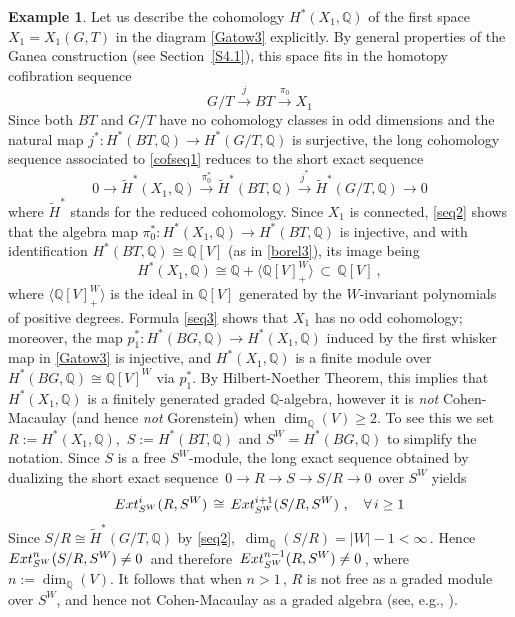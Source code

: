 \documentclass[11pt]{amsart}
\theoremstyle{definition}
\newtheorem{example}[theorem]{Example}
\theoremstyle{remark}
\numberwithin{equation}{section}
\newcommand{\la}{\label}
\def\Q{\mathbb{Q}}
\begin{document}
\begin{example}
\la{counterex}
Let us describe the cohomology $ H^*(X_1, \Q) $ of the first space $ X_1 = X_1(G,T) $ in the diagram \eqref{Gatow3} explicitly. By general properties of the Ganea construction (see Section~\ref{S4.1}), this space fits in the
homotopy cofibration sequence 
%
\begin{equation}
\la{cofseq1}
G/T \xrightarrow{j} BT \xrightarrow{\pi_0} X_1
\end{equation}
%
Since both $BT$ and $G/T$ have no cohomology classes in odd dimensions and the natural map $j^*: 
H^*(BT, \Q) \to H^*(G/T, \Q) $ is surjective, the long cohomology sequence associated to
\eqref{cofseq1} reduces to the short exact sequence
%
\begin{equation}
\la{seq2}
0 \to \tilde{H}^*(X_1, \Q) \xrightarrow{\pi^*_0}  \tilde{H}^*(BT, \Q) \xrightarrow{j^*} \tilde{H}^*(G/T, \Q) \to 0
\end{equation}
%
where $ \tilde{H}^* $ stands for the reduced cohomology. Since $X_1$ is connected, \eqref{seq2}
shows that the algebra map $ \pi^*_0: H^*(X_1, \Q) \to H^*(BT,\Q) $ is injective, and with 
identification $ H^*(BT, \Q) \cong \Q[V] $ (as in \eqref{borel3}), its image being
%
\begin{equation}
\la{seq3}
H^*(X_1, \Q) \cong \Q + \langle \Q[V]^W_+ \rangle\,\subset\,\Q[V]\ ,
\end{equation}
%
where $\langle \Q[V]^W_+ \rangle$ is the ideal in $\Q[V]$ generated by the $W$-invariant polynomials
of positive degrees. Formula \eqref{seq3} shows that $ X_1 $ has no odd cohomology; moreover, the map
$ p_1^*: H^*(BG, \Q) \to  H^*(X_1, \Q)  $ induced by the first whisker map in \eqref{Gatow3}
is injective, and $ H^*(X_1, \Q) $ is a finite module over $ H^*(BG, \Q) \cong \Q[V]^W $
via $ p_1^* $. By Hilbert-Noether Theorem, this implies that $ H^*(X_1, \Q) $ is a finitely generated
graded $\Q$-algebra, however it is {\it not} Cohen-Macaulay (and hence {\it not} Gorenstein) when $ \dim_{\Q}(V) \ge 2 $. To see this we set $ R :=  H^*(X_1, \Q) $, $\, S := H^*(BT, \Q) $ and $ S^W = H^*(BG, \Q) $ to simplify the notation. Since $S$ is a free $S^W$-module, the long exact sequence obtained by dualizing 
the short exact sequence $\,0 \to R \to S \to S/R \to 0\,$ over $S^W$ yields
%
$$
{\rm Ext}_{S^W}^i(R, S^W)\,\cong\, {\rm Ext}^{i+1}_{S^W}(S/R, S^W)\ ,\quad \forall \, i\ge 1
$$
%
Since $ S/R \cong \tilde{H}^*(G/T, \Q) $ by \eqref{seq2}, $\,\dim_{\Q}(S/R) = |W| - 1 < \infty \,$.
Hence ${\rm Ext}^n_{S^W}(S/R, S^W) \not= 0 \,$ and therefore $\, {\rm Ext}_{S^W}^{n-1}(R, S^W)  \not= 0 \,$, 
where $ n := \dim_{\Q}(V) $. It follows that when $ n > 1 \,$, $R$ is not free as a graded module over $S^W$, and hence  not Cohen-Macaulay as a graded algebra (see, e.g., \cite[Prop. 6.8]{Sm72}).
\end{example}
%
\end{document}
